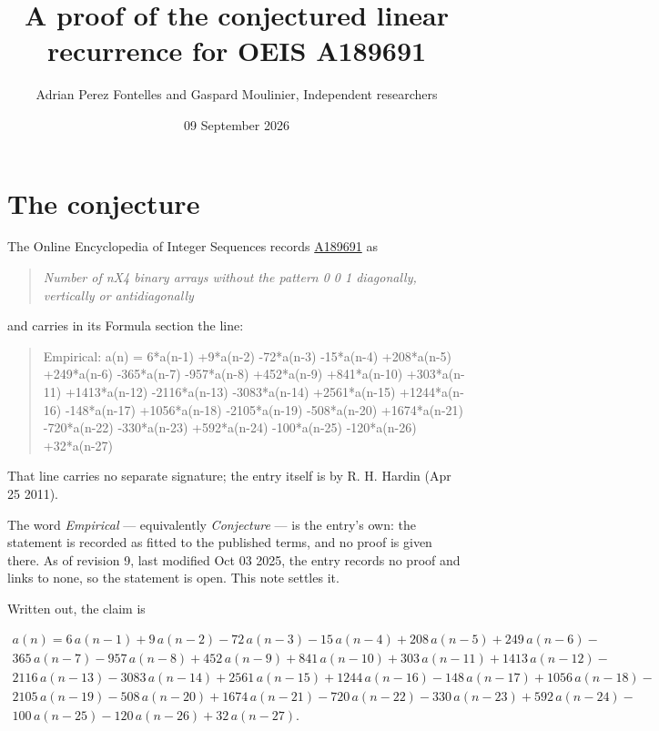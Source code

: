 \documentclass[11pt]{article}
\title{A proof of the conjectured linear recurrence for OEIS A189691}
\author{Adrian Perez Fontelles and Gaspard Moulinier, Independent researchers}
\date{09 September 2026}
\theoremstyle{definition}
\begin{document}
\maketitle
\section{The conjecture}

The Online Encyclopedia of Integer Sequences records \href{https://oeis.org/A189691}{A189691} as

\begin{quote}\itshape Number of nX4 binary arrays without the pattern 0 0 1 diagonally, vertically or antidiagonally\end{quote}

and carries in its Formula section the line:

\begin{quote}\ttfamily Empirical: a(n) = 6*a(n-1) +9*a(n-2) -72*a(n-3) -15*a(n-4) +208*a(n-5) +249*a(n-6) -365*a(n-7) -957*a(n-8) +452*a(n-9) +841*a(n-10) +303*a(n-11) +1413*a(n-12) -2116*a(n-13) -3083*a(n-14) +2561*a(n-15) +1244*a(n-16) -148*a(n-17) +1056*a(n-18) -2105*a(n-19) -508*a(n-20) +1674*a(n-21) -720*a(n-22) -330*a(n-23) +592*a(n-24) -100*a(n-25) -120*a(n-26) +32*a(n-27)\end{quote}

That line carries no separate signature; the entry itself is by R. H. Hardin (Apr 25 2011).

The word {\itshape Empirical} --- equivalently {\itshape Conjecture} --- is the entry's own: the statement is recorded as fitted to the published terms, and no proof is given there. As of revision 9, last modified Oct 03 2025, the entry records no proof and links to none, so the statement is open. This note settles it.

Written out, the claim is

\begin{multline*} a(n) = 6\,a(n-1) + 9\,a(n-2) - 72\,a(n-3) - 15\,a(n-4) + 208\,a(n-5) + 249\,a(n-6) - \\ 365\,a(n-7) - 957\,a(n-8) + 452\,a(n-9) + 841\,a(n-10) + 303\,a(n-11) + 1413\,a(n-12) - \\ 2116\,a(n-13) - 3083\,a(n-14) + 2561\,a(n-15) + 1244\,a(n-16) - 148\,a(n-17) + 1056\,a(n-18) - \\ 2105\,a(n-19) - 508\,a(n-20) + 1674\,a(n-21) - 720\,a(n-22) - 330\,a(n-23) + 592\,a(n-24) - \\ 100\,a(n-25) - 120\,a(n-26) + 32\,a(n-27). \end{multline*}
\end{document}
